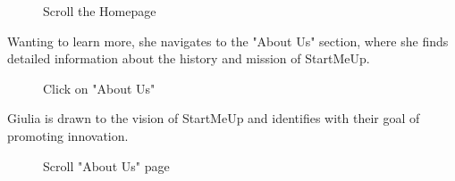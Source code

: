 \documentclass[11pt, letterpaper]{article}
\begin{document}
\begin{figure}[H]
    \centering
    \setlength{\fboxsep}{0pt}
    \caption{Scroll the Homepage}
    \label{fig:scenario2_1}
\end{figure}
\noindent
Wanting to learn more, she navigates to the "About Us" section, where she finds detailed information about the history and mission of StartMeUp.
\begin{figure}[H]
    \centering
    \setlength{\fboxsep}{0pt}
    \caption{Click on "About Us"}
    \label{fig:scenario2_2}
\end{figure}
\noindent
Giulia is drawn to the vision of StartMeUp and identifies with their goal of promoting innovation.
\begin{figure}[H]
    \centering
    \setlength{\fboxsep}{0pt}
    \caption{Scroll "About Us" page}
    \label{fig:scenario2_3}
\end{figure}
\end{document}
